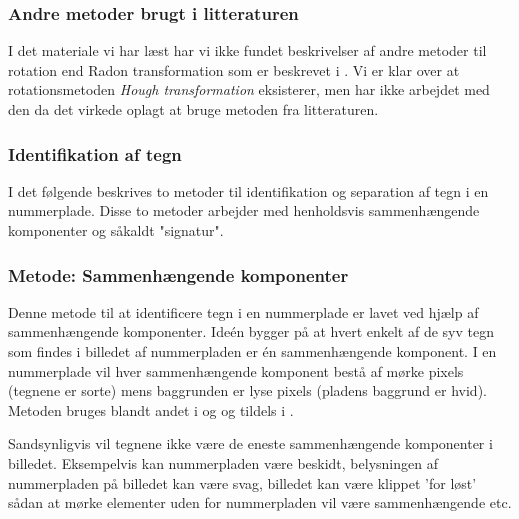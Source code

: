\subsubsection*{Andre metoder brugt i litteraturen}
I det materiale vi har læst har vi ikke fundet beskrivelser af andre metoder til rotation end Radon transformation som er beskrevet i \cite{sharpiro}. Vi er klar over at rotationsmetoden \textit{Hough transformation} eksisterer, men har ikke arbejdet med den da det virkede oplagt at bruge metoden fra litteraturen. 

\subsubsection{Identifikation af tegn}




I det følgende beskrives to metoder til identifikation og separation af tegn i en nummerplade. Disse to metoder arbejder med henholdsvis sammenhængende komponenter og såkaldt "signatur".

\subsubsection*{Metode: Sammenhængende komponenter}
Denne metode til at identificere tegn i en nummerplade er lavet ved hjælp af sammenhængende komponenter. Ideén bygger på at hvert enkelt af de syv tegn som findes i billedet af nummerpladen er én sammenhængende komponent. I en nummerplade vil hver sammenhængende komponent bestå af mørke pixels (tegnene er sorte) mens baggrunden er lyse pixels (pladens baggrund er hvid). Metoden bruges blandt andet i \cite{nijhuis} og \cite{parker} og tildels i \cite{kwas}.

Sandsynligvis vil tegnene ikke være de eneste sammenhængende komponenter i billedet. Eksempelvis kan nummerpladen være beskidt, belysningen af nummerpladen på billedet kan være svag, billedet kan være klippet 'for løst' sådan at mørke elementer uden for nummerpladen vil være sammenhængende etc.

